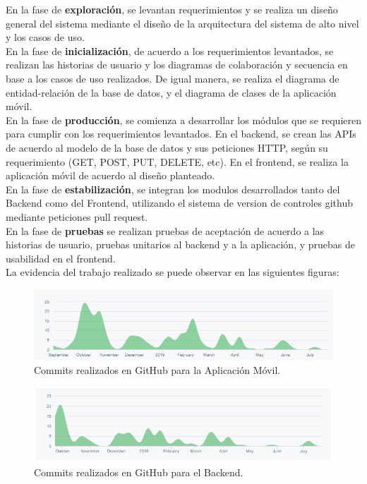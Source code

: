 \documentclass[12pt,letterpaper,openany]{book}
\begin{document}
En la fase de \textbf{exploración},  se levantan requerimientos y se realiza un diseño general del sistema mediante el diseño de la arquitectura del sistema de alto nivel y los casos de uso.
\\
En la fase de \textbf{inicialización}, de acuerdo a los requerimientos levantados, se realizan las historias de usuario y los diagramas de colaboración y secuencia en base a los casos de uso realizados. De igual manera, se realiza el diagrama de entidad-relación de la base de datos, y el diagrama de clases de la aplicación móvil.
\\
En la fase de \textbf{producción}, se comienza a desarrollar los módulos que se requieren para cumplir con los requerimientos levantados. En el backend, se crean las APIs de acuerdo al modelo de la base de datos y sus peticiones HTTP, según su requerimiento (GET, POST, PUT, DELETE, etc). En el frontend, se realiza la aplicación móvil de acuerdo al diseño planteado.
\\
En la fase de \textbf{estabilización}, se integran los modulos desarrollados tanto del Backend como del Frontend, utilizando el sistema de version de controles github mediante peticiones pull request.
\\
En la fase de \textbf{pruebas} se realizan pruebas de aceptación de acuerdo a las historias de usuario, pruebas unitarios al backend y a la aplicación, y pruebas de usabilidad en el frontend.
\\
La evidencia del trabajo realizado se puede observar en las siguientes figuras:
\begin{figure}[H]
\begin{center}
\includegraphics[width=13cm]{./imagenes/commitsApp}
\caption{Commits realizados en GitHub para la Aplicación Móvil.}
\end{center}
\end{figure}

\begin{figure}[H]
\begin{center}
\includegraphics[width=13cm]{./imagenes/commitsBackend}
\caption{Commits realizados en GitHub para el Backend.}
\end{center}
\end{figure}
\end{document}

